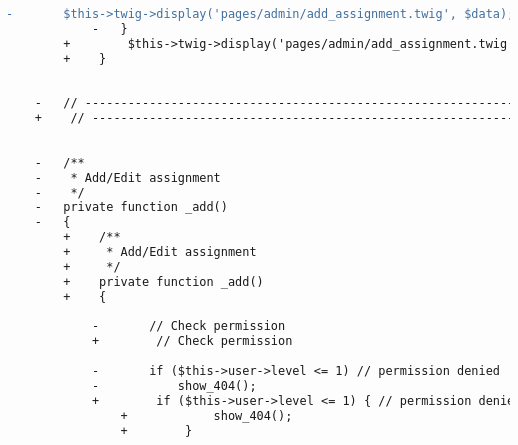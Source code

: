 \begin{lstlisting}[language=diff, caption=Perubahan pada kode Assignments.php]
			-		$this->twig->display('pages/admin/add_assignment.twig', $data);
			-	}
		+        $this->twig->display('pages/admin/add_assignment.twig', $data);
		+    }
	
	
	-	// ------------------------------------------------------------------------
	+    // ------------------------------------------------------------------------
	
	
	-	/**
	-	 * Add/Edit assignment
	-	 */
	-	private function _add()
	-	{
		+    /**
		+     * Add/Edit assignment
		+     */
		+    private function _add()
		+    {
			
			-		// Check permission
			+        // Check permission
			
			-		if ($this->user->level <= 1) // permission denied
			-			show_404();
			+        if ($this->user->level <= 1) { // permission denied
				+            show_404();
				+        }
			

\end{lstlisting}
